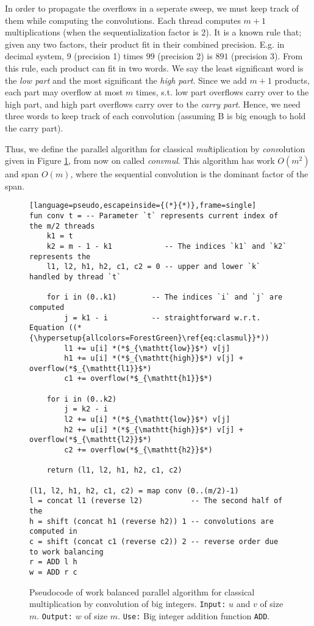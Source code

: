 In order to propagate the overflows in a seperate sweep, we must keep track of
them while computing the convolutions. Each thread computes $m+1$
multiplications (when the sequentialization factor is 2). It is a known rule
that; given any two factors, their product fit in their combined
precision. E.g. in decimal system, $9$ (precision 1) times $99$ (precision 2) is
$891$ (precision 3). From this rule, each product can fit in two words. We say
the least significant word is the \textit{low part} and the most significant the
\textit{high part}. Since we add $m+1$ products, each part may overflow at most
$m$ times, s.t. low part overflows carry over to the high part, and high part
overflows carry over to the \textit{carry part}. Hence, we need three words to
keep track of each convolution (assuming B is big enough to hold the carry
part).

Thus, we define the parallel algorithm for classical \textit{mul}tiplication by
\textit{conv}olution given in Figure \ref{fig:mulparalg}, from now on called
\textit{convmul}. This algorithm has work $O(m^2)$ and span $O(m)$, where the
sequential convolution is the dominant factor of the span.

\begin{figure}
\begin{lstlisting}[language=pseudo,escapeinside={(*}{*)},frame=single]
fun conv t = -- Parameter `t` represents current index of the m/2 threads
    k1 = t
    k2 = m - 1 - k1            -- The indices `k1` and `k2` represents the
    l1, l2, h1, h2, c1, c2 = 0 -- upper and lower `k` handled by thread `t`

    for i in (0..k1)        -- The indices `i` and `j` are computed
        j = k1 - i          -- straightforward w.r.t. Equation ((*{\hypersetup{allcolors=ForestGreen}\ref{eq:clasmul}}*))
        l1 += u[i] *(*$_{\mathtt{low}}$*) v[j]
        h1 += u[i] *(*$_{\mathtt{high}}$*) v[j] + overflow(*$_{\mathtt{l1}}$*)
        c1 += overflow(*$_{\mathtt{h1}}$*)

    for i in (0..k2)
        j = k2 - i
        l2 += u[i] *(*$_{\mathtt{low}}$*) v[j]
        h2 += u[i] *(*$_{\mathtt{high}}$*) v[j] + overflow(*$_{\mathtt{l2}}$*)
        c2 += overflow(*$_{\mathtt{h2}}$*)

    return (l1, l2, h1, h2, c1, c2)

(l1, l2, h1, h2, c1, c2) = map conv (0..(m/2)-1)
l = concat l1 (reverse l2)           -- The second half of the
h = shift (concat h1 (reverse h2)) 1 -- convolutions are computed in
c = shift (concat c1 (reverse c2)) 2 -- reverse order due to work balancing
r = ADD l h
w = ADD r c
\end{lstlisting}
  \caption{\footnotesize Pseudocode of work balanced parallel algorithm for classical multiplication by convolution of big integers. \texttt{Input:} $u$ and $v$ of size $m$. \texttt{Output:} $w$ of size $m$. \texttt{Use:} Big integer addition function \texttt{ADD}.}
  \label{fig:mulparalg}
\end{figure}

